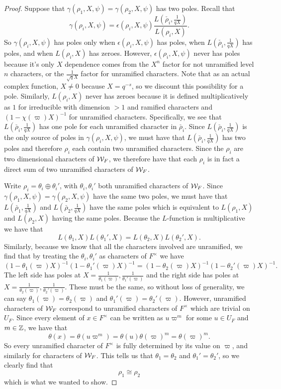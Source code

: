 \begin{proof}
  Suppose that $\gamma(\rho_1,X,\psi) = \gamma(\rho_2,X,\psi)$ has two poles.
  Recall that
  \[\gamma(\rho_i,X,\psi) = \epsilon(\rho_i,X,\psi) \frac{L(\check{\rho_i},\frac{1}{qX})}{L(\rho_i,X)}.\]
  So $\gamma(\rho_i,X,\psi)$ has poles only when $\epsilon(\rho_i,X,\psi)$ has poles, when $L(\check{\rho_i},\frac{1}{qX})$ has poles, and when $L(\rho_i,X)$ has zeroes.
  However, $\epsilon(\rho_i,X,\psi)$ never has poles because it's only $X$ dependence comes from the $X^n$ factor for not unramified level $n$ characters, or the $\frac{1}{\sqrt{q}X}$ factor for unramified characters.
  Note that as an actual complex function, $X \neq 0$ because $X = q^{-s}$, so we discount this possibility for a pole.
  Similarly, $L(\rho_i,X)$ never has zeroes because it is defined multiplicatively as $1$ for irreducible with dimension $> 1$ and ramified characters and $(1 - \chi(\varpi)X)^{-1}$ for unramified characters.
  Specifically, we see that $L(\check{\rho_i},\frac{1}{qX})$ has one pole for each unramified character in $\check{\rho_i}$.
  Since $L(\check{\rho_i}, \frac{1}{qX})$ is the only source of poles in $\gamma(\rho_i,X,\psi)$, we must have that $L(\check{\rho_i},\frac{1}{qX})$ has two poles and therefore $\rho_i$ each contain two unramified characters.
  Since the $\rho_i$ are two dimensional characters of $\mathcal{W}_F$, we therefore have that each $\rho_i$ is in fact a direct sum of two unramified characters of $\mathcal{W}_F$.

  Write $\rho_i = \theta_i \oplus \theta_i'$, with $\theta_i, \theta_i'$ both unramified characters of $\mathcal{W}_F$.
  Since $\gamma(\rho_1,X,\psi) = \gamma(\rho_2,X,\psi)$ have the same two poles, we must have that $L(\check{\rho_1},\frac{1}{qX})$ and $L(\check{\rho_2},\frac{1}{qX})$ have the same poles which is equivalent to $L(\rho_1,X)$ and $L(\rho_2,X)$ having the same poles.
  Because the $L$-function is multiplicative we have that
  \[L(\theta_1,X)L(\theta_1',X) = L(\theta_2,X)L(\theta_2',X).\]
  Similarly, because we know that all the characters involved are unramified, we find that by treating the $\theta_i,\theta_i'$ as characters of $F^\times$ we have
  \[(1 - \theta_1(\varpi)X)^{-1}(1 - \theta_1'(\varpi)X)^{-1} = (1 - \theta_2(\varpi)X)^{-1}(1 - \theta_2'(\varpi)X)^{-1}.\]
  The left side has poles at $X =  \frac{1}{\theta_1(\varpi)}, \frac{1}{\theta_1'(\varpi)}$ and the right side has poles at $X =  \frac{1}{\theta_2(\varpi)}, \frac{1}{\theta_2'(\varpi)}$.
  These must be the same, so without loss of generality, we can say $\theta_1(\varpi) = \theta_2(\varpi)$ and $\theta_1'(\varpi) = \theta_2'(\varpi)$.
  However, unramified characters of $\mathcal{W}_F$ correspond to unramified characters of $F^\times$ which are trivial on $U_F$.
  Since every element of $x \in F^\times$ can be written as $u\varpi^m$ for some $u \in U_F$ and $m \in \mathbb{Z}$, we have that
  \[\theta(x) = \theta(u\varpi^m) = \theta(u) \theta(\varpi)^m = \theta(\varpi)^m.\]
  So every unramified character of $F^\times$ is fully determined by its value on $\varpi$, and similarly for characters of $\mathcal{W}_F$.
  This tells us that $\theta_1 = \theta_2$ and $\theta_1' = \theta_2'$, so we clearly find that \[\rho_1 \cong \rho_2\] which is what we wanted to show.
\end{proof}


